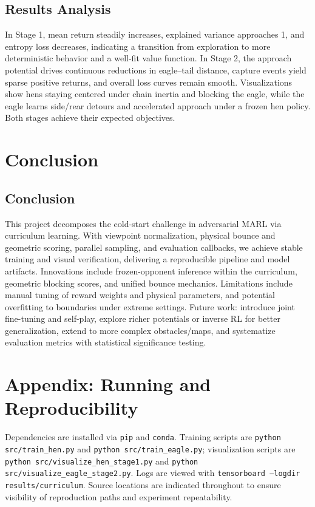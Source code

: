 \documentclass[12pt]{article}
\begin{document}

%

\subsection{Results Analysis}
In Stage 1, mean return steadily increases, explained variance approaches 1, and entropy loss decreases, indicating a transition from exploration to more deterministic behavior and a well-fit value function. In Stage 2, the approach potential drives continuous reductions in eagle–tail distance, capture events yield sparse positive returns, and overall loss curves remain smooth. Visualizations show hens staying centered under chain inertia and blocking the eagle, while the eagle learns side/rear detours and accelerated approach under a frozen hen policy. Both stages achieve their expected objectives.


\section{Conclusion}
\subsection{Conclusion}
This project decomposes the cold-start challenge in adversarial MARL via curriculum learning. With viewpoint normalization, physical bounce and geometric scoring, parallel sampling, and evaluation callbacks, we achieve stable training and visual verification, delivering a reproducible pipeline and model artifacts. Innovations include frozen-opponent inference within the curriculum, geometric blocking scores, and unified bounce mechanics. Limitations include manual tuning of reward weights and physical parameters, and potential overfitting to boundaries under extreme settings. Future work: introduce joint fine-tuning and self-play, explore richer potentials or inverse RL for better generalization, extend to more complex obstacles/maps, and systematize evaluation metrics with statistical significance testing.

\section{Appendix: Running and Reproducibility}
Dependencies are installed via \texttt{pip} and \texttt{conda}. Training scripts are \texttt{python src/train\_hen.py} and \texttt{python src/train\_eagle.py}; visualization scripts are \texttt{python src/visualize\_hen\_stage1.py} and \texttt{python src/visualize\_eagle\_stage2.py}. Logs are viewed with \texttt{tensorboard --logdir results/curriculum}. Source locations are indicated throughout to ensure visibility of reproduction paths and experiment repeatability.
\end{document}

